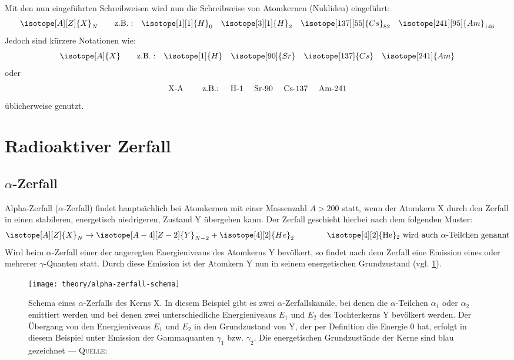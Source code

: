 \documentclass[../protokoll.tex]{subfiles}
\begin{document}
Mit den nun eingeführten Schreibweisen wird nun die Schreibweise von Atomkernen
(Nukliden) eingeführt:
\begin{equation*}
    \isotope[A][Z]{X}_N \qquad \mathrm{z.B.:} \quad 
    \isotope[1][1]{H}_0 \quad 
    \isotope[3][1]{H}_2 \quad
    \isotope[137][55]{Cs}_{82} \quad
    \isotope[241][95]{Am}_{146}
\end{equation*}
Jedoch sind kürzere Notationen wie:
\begin{equation*}
    \isotope[A]{X} \qquad \mathrm{z.B.:} \quad
    \isotope[1]{H} \quad 
    \isotope[90]{Sr} \quad
    \isotope[137]{Cs} \quad
    \isotope[241]{Am}
\end{equation*}
oder
\begin{equation*}
    \text{X-A \qquad z.B.: \quad
    H-1 \quad
    Sr-90 \quad
    Cs-137 \quad
    Am-241}
\end{equation*}
üblicherweise genutzt.
\newpage
\section{Radioaktiver Zerfall}
\subsection{\texorpdfstring{$\alpha$}{Alpha}-Zerfall}
Alpha-Zerfall ($\alpha$-Zerfall) findet hauptsächlich bei Atomkernen mit einer
Massenzahl $A > 200$ statt, wenn der Atomkern X durch den Zerfall in einen 
stabileren, energetisch niedrigeren, Zustand Y übergehen kann.
Der Zerfall geschieht hierbei nach dem folgenden Muster:
\begin{equation*}
    \isotope[A][Z]{X}_N \to \isotope[A-4][Z-2]{Y}_{N-2} + \isotope[4][2]{He}_{2}
     \qquad \qquad \text{\isotope[4][2]{He}$_{2}$ wird auch}\  \alpha \text{-Teilchen genannt}
\end{equation*}
Wird beim $\alpha$-Zerfall einer der angeregten Energieniveaus des Atomkerns Y
bevölkert, so findet nach dem Zerfall eine Emission eines oder mehrerer
$\gamma$-Quanten statt. Durch diese Emission ist der Atomkern Y nun in seinem
energetischen Grundzustand (vgl. \cref{fig:Schema Alpha-Zerfall}).

\begin{figure}[H]
    \centering
    \texttt{[image: theory/alpha-zerfall-schema]}
    \caption{Schema eines $\alpha$-Zerfalls des Kerns X. In diesem Beispiel gibt
    es zwei $\alpha$-Zerfallskanäle, bei denen die $\alpha$-Teilchen $\alpha_1$
    oder $\alpha_2$ emittiert werden und bei denen zwei unterschiedliche 
    Energieniveaus $E_1$ und $E_2$ des Tochterkerns Y bevölkert werden. Der 
    Übergang von den Energieniveaus $E_1$ und $E_2$ in den Grundzustand von Y, 
    der per Definition die Energie 0 hat, erfolgt in diesem Beispiel unter 
    Emission der Gammaquanten $\gamma_1$ bzw. $\gamma_2$. Die energetischen 
    Grundzustände der Kerne sind blau gezeichnet --- \textsc{Quelle:} \cite[S. 30, Abb. 1]{script}}
    \label{fig:Schema Alpha-Zerfall}
\end{figure}
\end{document}
